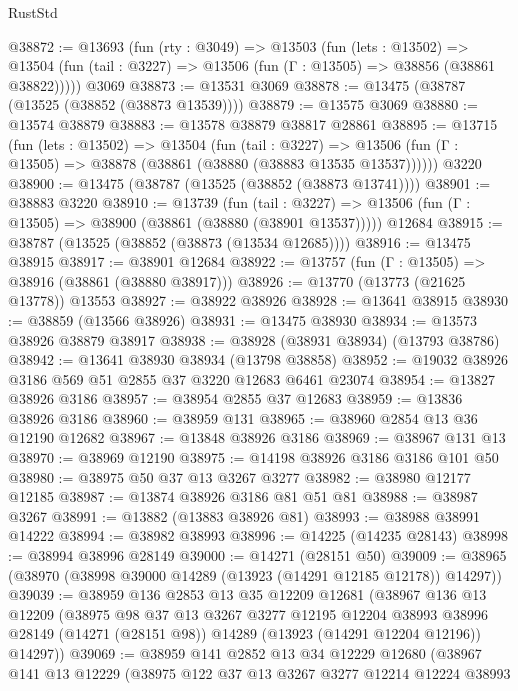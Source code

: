 \begin{lexlean}{RustStd}
\begin{coremodule}
@38872 := @13693
    (fun (rty : @3049) =>
    @13503
      (fun (lets : @13502) =>
      @13504 (fun (tail : @3227) => @13506 (fun (Γ : @13505) => @38856 (@38861 @38822)))))
    @3069
@38873 := @13531 @3069
@38878 := @13475 (@38787 (@13525 (@38852 (@38873 @13539))))
@38879 := @13575 @3069
@38880 := @13574 @38879
@38883 := @13578 @38879 @38817 @28861
@38895 := @13715
    (fun (lets : @13502) =>
    @13504
      (fun (tail : @3227) =>
      @13506 (fun (Γ : @13505) => @38878 (@38861 (@38880 (@38883 @13535 @13537))))))
    @3220
@38900 := @13475 (@38787 (@13525 (@38852 (@38873 @13741))))
@38901 := @38883 @3220
@38910 := @13739
    (fun (tail : @3227) => @13506 (fun (Γ : @13505) => @38900 (@38861 (@38880 (@38901 @13537)))))
    @12684
@38915 := @38787 (@13525 (@38852 (@38873 (@13534 @12685))))
@38916 := @13475 @38915
@38917 := @38901 @12684
@38922 := @13757 (fun (Γ : @13505) => @38916 (@38861 (@38880 @38917)))
@38926 := @13770 (@13773 (@21625 @13778)) @13553
@38927 := @38922 @38926
@38928 := @13641 @38915
@38930 := @38859 (@13566 @38926)
@38931 := @13475 @38930
@38934 := @13573 @38926 @38879 @38917
@38938 := @38928 (@38931 @38934) (@13793 @38786)
@38942 := @13641 @38930 @38934 (@13798 @38858)
@38952 := @19032 @38926 @3186 @569 @51 @2855 @37 @3220 @12683 @6461 @23074
@38954 := @13827 @38926 @3186
@38957 := @38954 @2855 @37 @12683
@38959 := @13836 @38926 @3186
@38960 := @38959 @131
@38965 := @38960 @2854 @13 @36 @12190 @12682
@38967 := @13848 @38926 @3186
@38969 := @38967 @131 @13
@38970 := @38969 @12190
@38975 := @14198 @38926 @3186 @3186 @101 @50
@38980 := @38975 @50 @37 @13 @3267 @3277
@38982 := @38980 @12177 @12185
@38987 := @13874 @38926 @3186 @81 @51 @81
@38988 := @38987 @3267
@38991 := @13882 (@13883 @38926 @81)
@38993 := @38988 @38991 @14222
@38994 := @38982 @38993
@38996 := @14225 (@14235 @28143)
@38998 := @38994 @38996 @28149
@39000 := @14271 (@28151 @50)
@39009 := @38965 (@38970 (@38998 @39000 @14289 (@13923 (@14291 @12185 @12178)) @14297))
@39039 := @38959
    @136
    @2853
    @13
    @35
    @12209
    @12681
    (@38967
      @136
      @13
      @12209
      (@38975
        @98
        @37
        @13
        @3267
        @3277
        @12195
        @12204
        @38993
        @38996
        @28149
        (@14271 (@28151 @98))
        @14289
        (@13923 (@14291 @12204 @12196))
        @14297))
@39069 := @38959
    @141
    @2852
    @13
    @34
    @12229
    @12680
    (@38967
      @141
      @13
      @12229
      (@38975
        @122
        @37
        @13
        @3267
        @3277
        @12214
        @12224
        @38993

\end{coremodule}
\end{lexlean}
